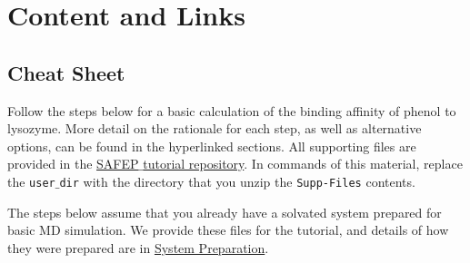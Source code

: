 \documentclass[9pt,tutorial]{livecoms}
\begin{document}

\section{Content and Links}

\subsection{Cheat Sheet}
Follow the steps below for a basic calculation of the binding affinity of phenol to lysozyme. More detail on the rationale for each step, as well as alternative options, can be found in the hyperlinked sections. All supporting files are provided in the \href{https://github.com/jhenin/SAFEP_tutorial}{SAFEP$\_$tutorial repository}. In commands of this material, replace the \texttt{user$\_$dir} with the directory that you unzip the \texttt{Supp-Files} contents.

The steps below assume that you already have a solvated system prepared for basic MD simulation. We provide these files for the tutorial, and details of how they were prepared are in \hyperref[sec:6.1]{System Preparation}.
\end{document}
